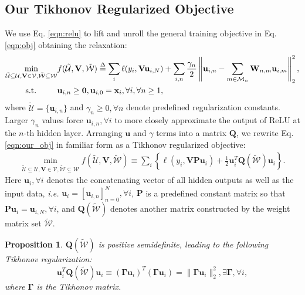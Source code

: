 \documentclass{article}
\def\ie{\emph{i.e. }}
\newtheorem{prop}{Proposition}
\begin{document}
	\subsection{Our Tikhonov Regularized Objective}
	We use Eq. \ref{eqn:relu} to lift and unroll the general training objective in Eq. \ref{eqn:obj} obtaining the relaxation:
	\begin{align}\label{eqn:our_obj}
	\min_{\tilde{\mathcal{U}}\subseteq\mathcal{U}, \mathbf{V}\in\mathcal{V}, \tilde{\mathcal{W}}\subseteq\mathcal{W}} & f(\tilde{\mathcal{U}}, \mathbf{V}, \tilde{\mathcal{W}}) \stackrel{\Delta}{=} \sum_i\ell(y_i, \mathbf{V}\mathbf{u}_{i,N}) + \sum_{i, n}\frac{\gamma_n}{2}\left\|\mathbf{u}_{i,n} - \sum_{m\in\mathcal{M}_n}\mathbf{W}_{n,m}\mathbf{u}_{i,m}\right\|_2^2, \\
	\mbox{s.t.} \hspace{9mm} & \mathbf{u}_{i,n} \geq \mathbf{0}, \mathbf{u}_{i,0}=\mathbf{x}_i, \forall i, \forall n\geq 1, \nonumber
	\end{align}
	where $\tilde{\mathcal{U}}=\{\mathbf{u}_{i,n}\}$ and $\gamma_n\geq0, \forall n$ denote predefined regularization constants.  Larger $\gamma_n$ values force $\mathbf{u}_{i,n}, \forall i$ to more closely approximate the output of ReLU at the $n$-th hidden layer. %
    Arranging $\mathbf{u}$ and $\gamma$ terms into a matrix $\mathbf{Q}$, we rewrite Eq. \ref{eqn:our_obj} in familiar form as a Tikhonov regularized objective:
    \begin{align}\label{eqn:f}
    \min_{\tilde{\mathcal{U}}\subseteq\mathcal{U}, \mathbf{V}\in\mathcal{V}, \tilde{\mathcal{W}}\subseteq\mathcal{W}} f(\tilde{\mathcal{U}}, \mathbf{V}, \tilde{\mathcal{W}}) \equiv \sum_i\left\{\ell(y_i, \mathbf{V}\mathbf{P}\mathbf{u}_{i}) + \frac{1}{2}\mathbf{u}_i^T\mathbf{Q}(\tilde{\mathcal{W}})\mathbf{u}_i\right\}.
    \end{align}
Here $\mathbf{u}_i, \forall i$ denotes the concatenating vector of all hidden outputs as well as the input data, \ie $\mathbf{u}_i=[\mathbf{u}_{i,n}]_{n=0}^N, \forall i$, $\mathbf{P}$ is a predefined constant matrix so that $\mathbf{P}\mathbf{u}_i=\mathbf{u}_{i,N}, \forall i$, and $\mathbf{Q}(\tilde{\mathcal{W}})$ denotes another matrix constructed by the weight matrix set $\tilde{\mathcal{W}}$.
    
    \begin{prop}\label{lem:Tikhonov}
    $\mathbf{Q}(\tilde{\mathcal{W}})$ is positive semidefinite, leading to the following Tikhonov regularization: $$\mathbf{u}_i^T\mathbf{Q}(\tilde{\mathcal{W}})\mathbf{u}_i\equiv(\boldsymbol{\Gamma}\mathbf{u}_i)^T(\boldsymbol{\Gamma}\mathbf{u}_i)=\|\boldsymbol{\Gamma}\mathbf{u}_i\|_2^2, \exists \boldsymbol{\Gamma}, \forall i,$$
    where $\boldsymbol{\Gamma}$ is the Tikhonov matrix.
    \end{prop}
    
\end{document}
